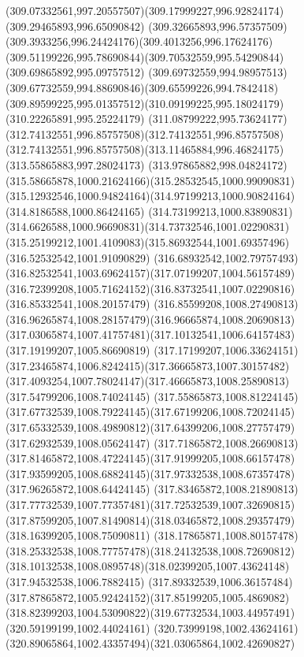 {{		\curveto(309.07332561,997.20557507)(309.17999227,996.92824174)(309.29465893,996.65090842)
		\curveto(309.32665893,996.57357509)(309.3933256,996.24424176)(309.4013256,996.17624176)
		\curveto(309.51199226,995.78690844)(309.70532559,995.54290844)(309.69865892,995.09757512)
		\curveto(309.69732559,994.98957513)(309.67732559,994.88690846)(309.65599226,994.7842418)
		\curveto(309.89599225,995.01357512)(310.09199225,995.18024179)(310.22265891,995.25224179)
		\curveto(311.08799222,995.73624177)(312.74132551,996.85757508)(312.74132551,996.85757508)
		\curveto(312.74132551,996.85757508)(313.11465884,996.46824175)(313.55865883,997.28024173)
		\curveto(313.97865882,998.04824172)(315.58665878,1000.21624166)(315.28532545,1000.99090831)
		\curveto(315.12932546,1000.94824164)(314.97199213,1000.90824164)(314.8186588,1000.86424165)
		\curveto(314.73199213,1000.83890831)(314.6626588,1000.96690831)(314.73732546,1001.02290831)
		\curveto(315.25199212,1001.4109083)(315.86932544,1001.69357496)(316.52532542,1001.91090829)
		\curveto(316.68932542,1002.79757493)(316.82532541,1003.69624157)(317.07199207,1004.56157489)
		\curveto(316.72399208,1005.71624152)(316.83732541,1007.02290816)(316.85332541,1008.20157479)
		\curveto(316.85599208,1008.27490813)(316.96265874,1008.28157479)(316.96665874,1008.20690813)
		\curveto(317.03065874,1007.41757481)(317.10132541,1006.64157483)(317.19199207,1005.86690819)
		\curveto(317.17199207,1006.33624151)(317.23465874,1006.8242415)(317.36665873,1007.30157482)
		\curveto(317.4093254,1007.78024147)(317.46665873,1008.25890813)(317.54799206,1008.74024145)
		\curveto(317.55865873,1008.81224145)(317.67732539,1008.79224145)(317.67199206,1008.72024145)
		\curveto(317.65332539,1008.49890812)(317.64399206,1008.27757479)(317.62932539,1008.05624147)
		\curveto(317.71865872,1008.26690813)(317.81465872,1008.47224145)(317.91999205,1008.66157478)
		\curveto(317.93599205,1008.68824145)(317.97332538,1008.67357478)(317.96265872,1008.64424145)
		\curveto(317.83465872,1008.21890813)(317.77732539,1007.77357481)(317.72532539,1007.32690815)
		\curveto(317.87599205,1007.81490814)(318.03465872,1008.29357479)(318.16399205,1008.75090811)
		\curveto(318.17865871,1008.80157478)(318.25332538,1008.77757478)(318.24132538,1008.72690812)
		\curveto(318.10132538,1008.0895748)(318.02399205,1007.43624148)(317.94532538,1006.7882415)
		\curveto(317.89332539,1006.36157484)(317.87865872,1005.92424152)(317.85199205,1005.4869082)
		\curveto(318.82399203,1004.53090822)(319.67732534,1003.44957491)(320.59199199,1002.44024161)
		\curveto(320.73999198,1002.43624161)(320.89065864,1002.43357494)(321.03065864,1002.42690827)
}}
